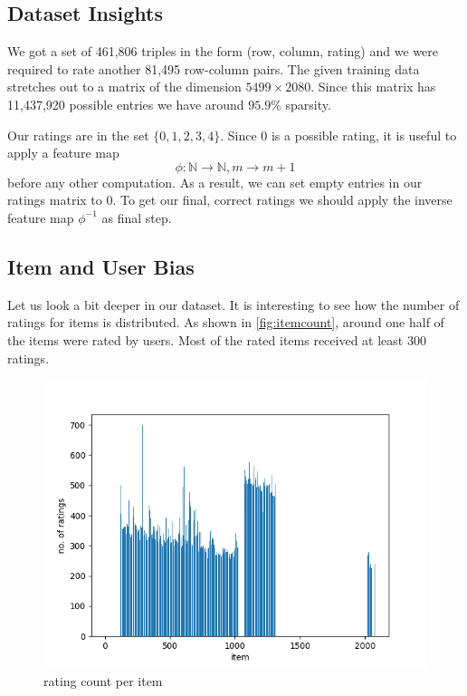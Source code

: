 \documentclass[DIV=14,twocolumn]{scrartcl}
\begin{document}
\subsection{Dataset Insights}\label{datsetinsight}
We got a set of 461,806 triples in the form (row, column, rating) and we were required to rate another 81,495 row-column pairs. 
The given training data stretches out to a matrix of the dimension $5499\times 2080$. Since this matrix has 11,437,920 possible entries we have around $95.9\%$ sparsity.

Our ratings are in the set $\{0,1,2,3,4\}$. Since 0 is a possible rating, it is useful to apply a feature map $$\phi:\mathbb{N}\rightarrow\mathbb{N},m\rightarrow m+1$$ before any other computation. As a result, we can set empty entries in our ratings matrix to 0. To get our final, correct ratings we should apply the inverse feature map $\phi^{-1}$ as final step.

\subsection{Item and User Bias}\label{bias}
Let us look a bit deeper in our dataset. It is interesting to see how the number of ratings for items is distributed. As shown in \autoref{fig:itemcount}, around one half of the items were rated by users. Most of the rated items received at least 300 ratings. 
\begin{figure}[h]
	\includegraphics[width=\columnwidth]{../img/item-count}
	\caption{rating count per item}
	\label{fig:itemcount}
\end{figure}
\end{document}
